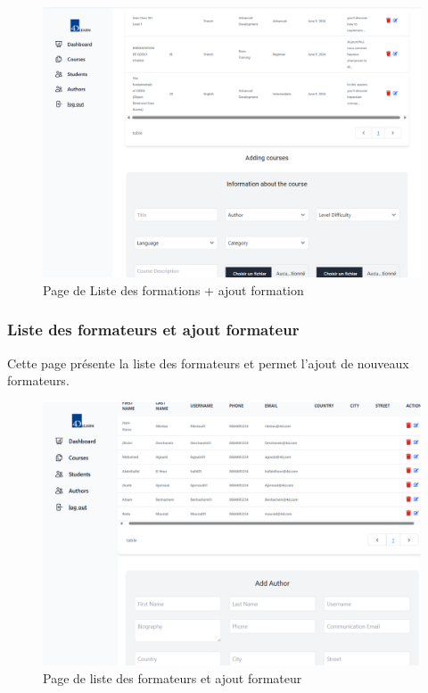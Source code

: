 \begin{figure}[H]
    \centering
    \includegraphics[width=19cm]{Figures/addCourse.png}
    \caption{ Page de Liste des formations + ajout formation}
\end{figure}

\subsubsection{Liste des formateurs et ajout formateur }

Cette page présente la liste des formateurs et permet l'ajout de nouveaux formateurs.

\begin{figure}[H]
    \centering
    \includegraphics[width=19cm]{Figures/addAuthor.png}
    \caption{ Page de liste des formateurs et ajout formateur }
\end{figure}


